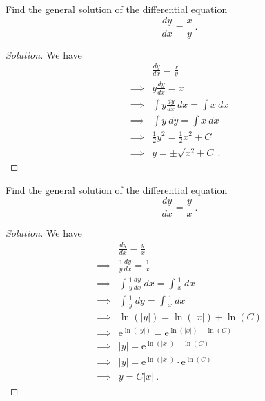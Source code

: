 \documentclass[compacto,10pt,comentarios]{aleph-notas}
\begin{document}
\begin{ejer}
    Find the general solution of the differential equation
    $$
        \frac{dy}{dx} = \frac{x}{y} ~ .
    $$
\end{ejer}
\begin{proof}[Solution]
    We have
    \begin{align*}
                 & \frac{dy}{dx} = \frac{x}{y} \\
        \implies & y \frac{dy}{dx} = x \\ 
        \implies & \int y \frac{dy}{dx} ~ dx = \int x ~ dx \\ 
        \implies & \int y ~ dy = \int x ~ dx \\ 
        \implies & \frac{1}{2}y^{2} = \frac{1}{2} x^{2} + C \\ 
        \implies & y = \pm \sqrt{x^{2} + C} ~ .
    \end{align*}
\end{proof}

\begin{ejer}
    Find the general solution of the differential equation
    $$
        \frac{dy}{dx} = \frac{y}{x} ~ .
    $$
\end{ejer}
\begin{proof}[Solution]
    We have
    \begin{align*}
                 &  \frac{dy}{dx} = \frac{y}{x}  \\
        \implies & \frac{1}{y} \frac{dy}{dx} = \frac{1}{x} \\ 
        \implies & \int \frac{1}{y} \frac{dy}{dx} ~ dx = \int \frac{1}{x} ~ dx \\ 
        \implies & \int \frac{1}{y} ~ dy = \int \frac{1}{x} ~ dx \\ 
        \implies & \ln(|y|) = \ln(|x|) + \ln(C) \\
        \implies & \mathrm{e}^{\ln(|y|)} = \mathrm{e}^{\ln(|x|) + \ln(C)} \\
        \implies & |y| = \mathrm{e}^{\ln(|x|) + \ln(C)} \\
        \implies & |y| = \mathrm{e}^{\ln(|x|)}\cdot\mathrm{e}^{\ln(C)} \\
        \implies & y = C |x| ~ .
    \end{align*}
\end{proof}
\end{document}
